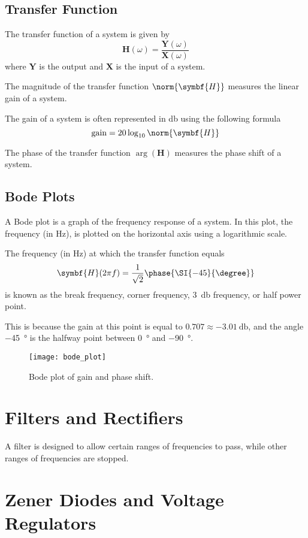 \documentclass{article}
\begin{document}
\subsection{Transfer Function}
\begin{definition}
    The transfer function of a system is given by
    \begin{equation*}
        \symbf{H}(\omega) = \frac{\symbf{Y}(\omega)}{\symbf{X}(\omega)}
    \end{equation*}
    where $\symbf{Y}$ is the output and $\symbf{X}$ is the input of a system.
\end{definition}
\begin{definition}
    The magnitude of the transfer function $\norm{\symbf{H}}$ measures the linear gain of a system.
\end{definition}
\begin{definition}
    The gain of a system is often represented in \si{\decibel} using the following formula
    \begin{equation*}
        \mathrm{gain} = 20 \log_{10}{\norm{\symbf{H}}}
    \end{equation*}
\end{definition}
\begin{definition}
    The phase of the transfer function $\arg{\left( \symbf{H} \right)}$ measures the phase shift of a system.
\end{definition}
\subsection{Bode Plots}
A Bode plot is a graph of the frequency response of a system. 
In this plot, the frequency (in \si{\hertz}), is plotted on the horizontal axis using a logarithmic scale.
\begin{definition}
    The frequency (in \si{\hertz}) at which the transfer function equals
    \begin{equation*}
        \symbf{H}(2\pi f) = \frac{1}{\sqrt{2}}\phase{\SI{-45}{\degree}}
    \end{equation*}
    is known as the break frequency, corner frequency,
    \SI{3}{\decibel} frequency, or half power point. 

    This is because the gain at this point is equal to $\SI{0.707} \approx \SI{-3.01}{\decibel}$, 
    and the angle \SI{-45}{\degree} is the halfway point between \SI{0}{\degree} and \SI{-90}{\degree}.
\end{definition}
\begin{figure}[H]
    \centering
    \texttt{[image: bode\_plot]}
    \caption{Bode plot of gain and phase shift.}
\end{figure}
\newpage
\section{Filters and Rectifiers}
\begin{definition}[Filters]
    A filter is designed to allow certain ranges of frequencies to pass, 
    while other ranges of frequencies are stopped.
\end{definition}
\newpage
\section{Zener Diodes and Voltage Regulators}
\newpage
\end{document}
